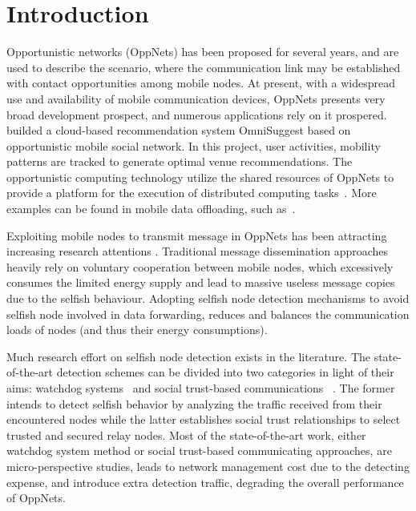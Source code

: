 \section{Introduction}
\label{sec:intro}
Opportunistic networks (OppNets)
has been proposed for several years,
and are used to describe the scenario,
where the communication link may be
established with contact opportunities
among mobile nodes.
At present, with a widespread use and
availability of mobile communication devices,
OppNets presents very broad development prospect,
and numerous applications rely on it prospered.
\cite{DBLP:journals/tsc/KhalidKKZ14} builded a
cloud-based recommendation system OmniSuggest
based on opportunistic mobile social network.
In this project, user activities,
mobility patterns are tracked to
generate optimal venue recommendations.
The opportunistic computing technology utilize
the shared resources of OppNets to
provide a platform for the execution
of distributed computing tasks~\cite{DBLP:journals/tmc/ChatzopoulosAKH18}.
More examples can be found in mobile data offloading,
such as~\cite{DBLP:journals/tmc/HanHKMSS12,
DBLP:journals/tmc/LiQJHW014}.

Exploiting mobile nodes to transmit message in
OppNets has been attracting
increasing research attentions
\cite{DBLP:conf/sigcomm/SouzaMSMCC16,
DBLP:conf/mobicom/RadenkovicH17,
DBLP:journals/comsur/JedariXN18,
DBLP:journals/tmc/LoretiB20}.
Traditional message dissemination approaches
heavily rely on voluntary cooperation between
mobile nodes, which excessively consumes the
limited energy supply and lead to massive useless
message copies due to the selfish behaviour.
Adopting selfish node detection mechanisms
to avoid selfish node involved in data forwarding,
reduces and balances the communication loads
of nodes (and thus their energy consumptions).


Much research effort on selfish node detection
exists in the literature. The state-of-the-art
detection schemes can be divided into two categories
in light of their aims:
watchdog systems~\cite{DBLP:conf/mobicom/MartiGLB00,
DBLP:journals/tmc/Hernandez-Orallo15,
DBLP:journals/tie/DiasRXM15,
DBLP:journals/fgcs/JedariXCDTA19}
and social trust-based communications
~\cite{DBLP:journals/tpds/ZhuDGDC14,
DBLP:journals/tdsc/ChoC18,
DBLP:journals/tmc/ChoiSLW12}.
The former intends to detect selfish behavior
by analyzing the traffic received
from their encountered nodes
while the latter establishes social trust relationships
to select trusted and secured relay nodes.
Most of the state-of-the-art work,
either watchdog system method
or social trust-based communicating approaches,
are micro-perspective studies,
leads to network management cost
due to the detecting expense,
and introduce extra detection traffic,
degrading the overall performance of OppNets.

